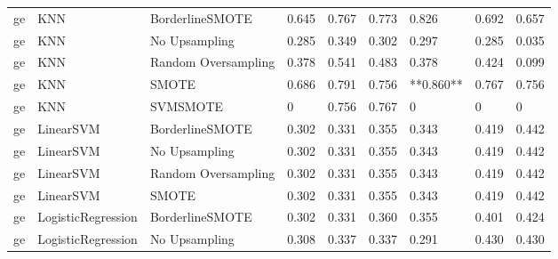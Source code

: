 \begin{tabular}{lllllllll}
      ge &                          KNN &     BorderlineSMOTE & 0.645 &                     0.767 &                 0.773 &                  0.826 &                                   0.692 &     0.657 \\
      ge &                          KNN &       No Upsampling & 0.285 &                     0.349 &                 0.302 &                  0.297 &                                   0.285 &     0.035 \\
      ge &                          KNN & Random Oversampling & 0.378 &                     0.541 &                 0.483 &                  0.378 &                                   0.424 &     0.099 \\
      ge &                          KNN &               SMOTE & 0.686 &                     0.791 &                 0.756 &              **0.860** &                                   0.767 &     0.756 \\
      ge &                          KNN &            SVMSMOTE &     0 &                     0.756 &                 0.767 &                      0 &                                       0 &         0 \\
      ge &                    LinearSVM &     BorderlineSMOTE & 0.302 &                     0.331 &                 0.355 &                  0.343 &                                   0.419 &     0.442 \\
      ge &                    LinearSVM &       No Upsampling & 0.302 &                     0.331 &                 0.355 &                  0.343 &                                   0.419 &     0.442 \\
      ge &                    LinearSVM & Random Oversampling & 0.302 &                     0.331 &                 0.355 &                  0.343 &                                   0.419 &     0.442 \\
      ge &                    LinearSVM &               SMOTE & 0.302 &                     0.331 &                 0.355 &                  0.343 &                                   0.419 &     0.442 \\
      ge &           LogisticRegression &     BorderlineSMOTE & 0.302 &                     0.331 &                 0.360 &                  0.355 &                                   0.401 &     0.424 \\
      ge &           LogisticRegression &       No Upsampling & 0.308 &                     0.337 &                 0.337 &                  0.291 &                                   0.430 &     0.430 \\

\end{tabular}
